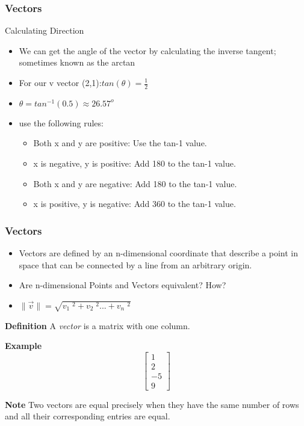  \begin{frame}[fragile] \frametitle{Vectors}
Calculating Direction
\begin{itemize}

\item We can get the angle of the vector by calculating the inverse tangent; sometimes known as the arctan
\item For our v vector (2,1):$tan(\theta) = \frac{1}{2}$
\item $\theta = tan^{-1} (0.5) \approx 26.57^{o}$
\item use the following rules:
\begin{itemize}

\item Both x and y are positive: Use the tan-1 value.
\item x is negative, y is positive: Add 180 to the tan-1 value.
\item Both x and y are negative: Add 180 to the tan-1 value.
\item x is positive, y is negative: Add 360 to the tan-1 value.
\end{itemize}
\end{itemize}


\end{frame}




 \begin{frame}[fragile] \frametitle{Vectors}

\begin{itemize}

\item Vectors are defined by an n-dimensional coordinate that describe a point in space that can be connected by a line from an arbitrary origin.
\item Are n-dimensional Points and Vectors equivalent? How?
\item $\|\vec{v}\| = \sqrt{v_{1}\;^{2} + v_{2}\;^{2} ... + v_{n}\;^{2}}$
\end{itemize}

\end{frame}



  \begin{frame}[fragile]
\textbf{Definition}
  A {\em vector} is a matrix with one column.


 \textbf{Example}
  \[
  \left[\begin{array}{r}
   1 \\2 \\-5\\ 9  
  \end{array}\right]
 \]
  
  
\textbf{Note}
Two vectors are equal precisely when they have the same number
of rows and all their corresponding entries are  equal.

\end{frame}

